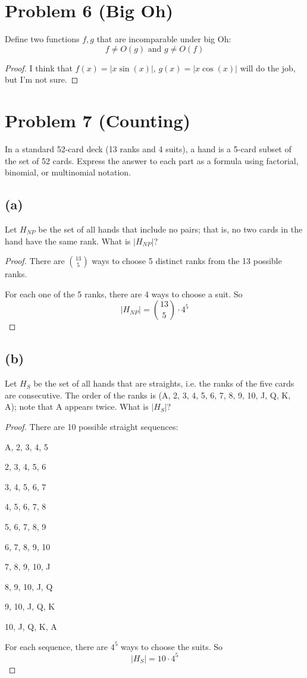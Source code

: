\documentclass[14pt]{extarticle}
\begin{document}
\section{Problem 6 (Big Oh)}
Define two functions $f,g$ that are incomparable under big Oh:
$$
f \neq O(g) \text{  and  } g \neq O(f)
$$
\begin{proof}
I think that $f(x) = |x\sin(x)|$, $g(x) = |x\cos(x)|$ will do the job, but I'm not sure.
\end{proof}

\section{Problem 7 (Counting)}
In a standard 52-card deck (13 ranks and 4 suits), a hand is a 5-card subset of the set of 52 cards. Express the answer to each part as a formula using factorial, binomial, or multinomial notation.
\subsection{(a)}
Let $H_{NP}$ be the set of all hands that include no pairs; that is, no two cards in the hand have the same rank. What is $|H_{NP}|$?
\begin{proof}
There are $\binom{13}{5}$ ways to choose 5 distinct ranks from the 13 possible ranks.

For each one of the 5 ranks, there are 4 ways to choose a suit. So
$$
|H_{NP}| = \binom{13}{5} \cdot 4^5
$$
\end{proof}
\subsection{(b)}
Let $H_{S}$ be the set of all hands that are straights, i.e. the ranks of the five cards are consecutive. The order of the ranks is (A, 2, 3, 4, 5, 6, 7, 8, 9, 10, J, Q, K, A); note that A appears twice. What is $|H_{S}|$?
\begin{proof}
There are 10 possible straight sequences:

A, 2, 3, 4, 5

2, 3, 4, 5, 6

3, 4, 5, 6, 7

4, 5, 6, 7, 8

5, 6, 7, 8, 9

6, 7, 8, 9, 10

7, 8, 9, 10, J

8, 9, 10, J, Q

9, 10, J, Q, K

10, J, Q, K, A

For each sequence, there are $4^5$ ways to choose the suits. So
$$
|H_{S}| = 10 \cdot 4^5
$$
\end{proof}
\end{document}
